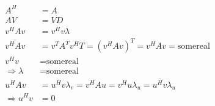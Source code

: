 \documentclass[UTF8,c5size]{ctexart}
\begin{document}
\begin{equation}
    \begin{split}
        A^H&=A\\
        AV&=VD\\
        v^HAv&=v^Hv\lambda\\
        \overline{v^HAv}&=v^TA^Tv^HT=(v^HAv)^T=v^HAv=\text{somereal}\\
        v^Hv&=\text{somereal}\\
        \Rightarrow \lambda&=\text{somereal}\\
        u^HAv&=u^Hv\lambda_v=v^HAu=v^Hu\lambda_u=\overline{u^Hv}\lambda_u\\
        \Rightarrow u^Hv&=0
    \end{split}
\end{equation}
\end{document}
